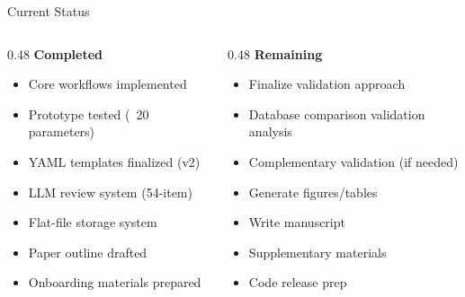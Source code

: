 \documentclass[10pt]{beamer}
\begin{document}
\begin{frame}{Current Status}

  \begin{columns}[T]
    \begin{column}{0.48\textwidth}
      \textcolor{successgreen}{\textbf{Completed}}
      \begin{itemize}
        \item[\checkmark] Core workflows implemented
        \item[\checkmark] Prototype tested (~20 parameters)
        \item[\checkmark] YAML templates finalized (v2)
        \item[\checkmark] LLM review system (54-item)
        \item[\checkmark] Flat-file storage system
        \item[\checkmark] Paper outline drafted
        \item[\checkmark] Onboarding materials prepared
      \end{itemize}
    \end{column}

    \begin{column}{0.48\textwidth}
      \textbf{Remaining}
      \begin{itemize}
        \item[$\square$] Finalize validation approach
        \item[$\square$] Database comparison validation analysis
        \item[$\square$] Complementary validation (if needed)
        \item[$\square$] Generate figures/tables
        \item[$\square$] Write manuscript
        \item[$\square$] Supplementary materials
        \item[$\square$] Code release prep
      \end{itemize}
    \end{column}
  \end{columns}

\end{frame}
\end{document}
